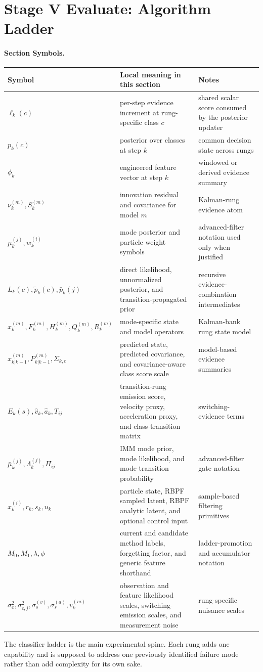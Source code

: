 \documentclass[11pt]{article}
\newcommand{\sectionsymbol}[3]{#1 & #2 & #3 \\}
\newcommand{\sectionsymbols}[1]{%
\begin{center}
\small
\setlength{\tabcolsep}{4pt}
\begin{tabularx}{0.95\textwidth}{>{\raggedright\arraybackslash}p{0.16\textwidth}X>{\raggedright\arraybackslash}p{0.18\textwidth}}
\toprule
Symbol & Local meaning in this section & Notes \\
\midrule
#1
\bottomrule
\end{tabularx}
\end{center}
}
\begin{document}
\section{Stage V Evaluate: Algorithm Ladder}
\paragraph{Section Symbols.}
\sectionsymbols{
\sectionsymbol{\(\ell_k(c)\)}{per-step evidence increment at rung-specific class \(c\)}{shared scalar score consumed by the posterior updater}
\sectionsymbol{\(p_k(c)\)}{posterior over classes at step \(k\)}{common decision state across rungs}
\sectionsymbol{\(\phi_k\)}{engineered feature vector at step \(k\)}{windowed or derived evidence summary}
\sectionsymbol{\(\nu_k^{(m)}, S_k^{(m)}\)}{innovation residual and covariance for model \(m\)}{Kalman-rung evidence atom}
\sectionsymbol{\(\mu_k^{(j)}, w_k^{(i)}\)}{mode posterior and particle weight symbols}{advanced-filter notation used only when justified}
\sectionsymbol{\(L_k(c), \tilde{p}_k(c), \bar{p}_k(j)\)}{direct likelihood, unnormalized posterior, and transition-propagated prior}{recursive evidence-combination intermediates}
\sectionsymbol{\(x_k^{(m)}, F_k^{(m)}, H_k^{(m)}, Q_k^{(m)}, R_k^{(m)}\)}{mode-specific state and model operators}{Kalman-bank rung state model}
\sectionsymbol{\(\hat{x}_{k|k-1}^{(m)}, P_{k|k-1}^{(m)}, \Sigma_{k,c}\)}{predicted state, predicted covariance, and covariance-aware class score scale}{model-based evidence summaries}
\sectionsymbol{\(E_k(s), \hat{v}_k, \hat{a}_k, T_{ij}\)}{transition-rung emission score, velocity proxy, acceleration proxy, and class-transition matrix}{switching-evidence terms}
\sectionsymbol{\(\bar{\mu}_k^{(j)}, \Lambda_k^{(j)}, \Pi_{ij}\)}{IMM mode prior, mode likelihood, and mode-transition probability}{advanced-filter gate notation}
\sectionsymbol{\(x_k^{(i)}, r_k, s_k, u_k\)}{particle state, RBPF sampled latent, RBPF analytic latent, and optional control input}{sample-based filtering primitives}
\sectionsymbol{\(M_0, M_1, \lambda, \phi\)}{current and candidate method labels, forgetting factor, and generic feature shorthand}{ladder-promotion and accumulator notation}
\sectionsymbol{\(\sigma_c^2, \sigma_{c,j}^2, \sigma_s^{(v)}, \sigma_s^{(a)}, v_k^{(m)}\)}{observation and feature likelihood scales, switching-emission scales, and measurement noise}{rung-specific nuisance scales}
}

\noindent
The classifier ladder is the main experimental spine. Each rung adds one capability and is supposed to address one previously identified failure mode rather than add complexity for its own sake.

\end{document}
